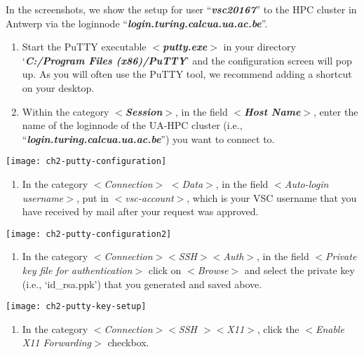   In the screenshots, we show the setup for user ``\textbf{\textit{vsc20167}}''
  to the HPC cluster in Antwerp via the loginnode
  ``\textbf{\textit{login.turing.calcua.ua.ac.be}}''.

  \begin{enumerate}
    \item  Start the PuTTY executable $<$\textbf{\textit{putty.exe}}$>$ in your
      directory `\textbf{\textit{C:/Program Files (x86)/PuTTY}}' and the
      configuration screen will pop up. As you will often use the PuTTY tool,
      we recommend adding a shortcut on your desktop.
    \item  Within the category $<$\textbf{\textit{Session}}$>$, in the field
      $<$\textbf{\textit{Host Name}}$>$, enter the name of the loginnode of the
      UA-HPC cluster (i.e., ``\textbf{\textit{login.turing.calcua.ua.ac.be}}'')
      you want to connect to.
  \end{enumerate}

  \texttt{[image: ch2-putty-configuration]}

  \begin{enumerate}
    \item  In the category $<$\textit{Connection}$>$ $<$\textit{Data}$>$, in
      the field $<$\textit{Auto-login username}$>$, put in
      $<$\textit{vsc-account}$>$, which is your VSC username that you have
      received by mail after your request was approved.
  \end{enumerate}

  \texttt{[image: ch2-putty-configuration2]}

  \begin{enumerate}
    \item  In the category $<$\textit{Connection$>$$<$SSH$>$$<$Auth$>$}, in the
      field $<$\textit{Private key file for authentication}$>$ click on
      $<$\textit{Browse}$>$ and select the private key (i.e., `id\_rsa.ppk')
      that you generated and saved above.
  \end{enumerate}

  \texttt{[image: ch2-putty-key-setup]}

  \begin{enumerate}
    \item  In the category $<$\textit{Connection$>$$<$SSH $>$$<$X11$>$}, click
      the $<$\textit{Enable X11 Forwarding}$>$ checkbox.
  \end{enumerate}

